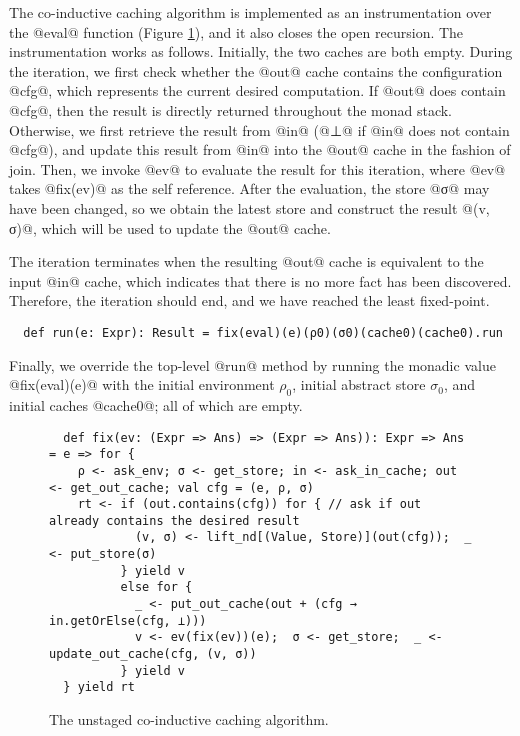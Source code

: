 The co-inductive caching algorithm is implemented as an instrumentation over the
@eval@ function (Figure \ref{fig:coind_cache}), and it also closes the open recursion.
The instrumentation works as follows. Initially, the two caches are both empty.
During the iteration, we first check whether the @out@ cache contains the
configuration @cfg@, which represents the current desired computation. If @out@
does contain @cfg@, then the result is directly returned throughout the monad
stack.
Otherwise, we first retrieve the result from @in@ (@⊥@ if @in@ does not contain
@cfg@), and update this result from @in@ into the @out@ cache in the fashion of
join. Then, we invoke @ev@ to evaluate the result for this iteration, where
@ev@ takes @fix(ev)@ as the self reference.  After the evaluation, the store @σ@
may have been changed, so we obtain the latest store and construct the
result @(v, σ)@, which will be used to update the @out@ cache.

The iteration terminates when the resulting @out@ cache is equivalent to the
input @in@ cache, which indicates that there is no more fact has been discovered.
Therefore, the iteration should end, and we have reached the least fixed-point.
\begin{lstlisting}
  def run(e: Expr): Result = fix(eval)(e)(ρ0)(σ0)(cache0)(cache0).run
\end{lstlisting}

Finally, we override the top-level @run@ method by running the monadic value
@fix(eval)(e)@ with the initial environment $\rho_0$, initial abstract
store $\sigma_0$, and initial caches @cache0@; all of which are empty.
\begin{figure}[t]
  \centering
\begin{lstlisting}
  def fix(ev: (Expr => Ans) => (Expr => Ans)): Expr => Ans = e => for {
    ρ <- ask_env; σ <- get_store; in <- ask_in_cache; out <- get_out_cache; val cfg = (e, ρ, σ)
    rt <- if (out.contains(cfg)) for { // ask if out already contains the desired result
            (v, σ) <- lift_nd[(Value, Store)](out(cfg));  _ <- put_store(σ)
          } yield v
          else for {
            _ <- put_out_cache(out + (cfg → in.getOrElse(cfg, ⊥)))
            v <- ev(fix(ev))(e);  σ <- get_store;  _ <- update_out_cache(cfg, (v, σ))
          } yield v
  } yield rt
\end{lstlisting}
\vspace{-1em}
\caption{The unstaged co-inductive caching algorithm.}
\label{fig:coind_cache}
\vspace{-1em}
\end{figure}

